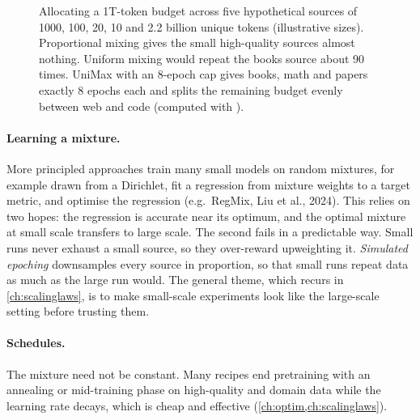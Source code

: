 \begin{figure}[t]
\centering
{}
\caption{Allocating a 1T-token budget across five hypothetical sources of 1000, 100, 20, 10 and 2.2
billion unique tokens (illustrative sizes). Proportional mixing gives the small high-quality
sources almost nothing. Uniform mixing would repeat the books source about 90 times. UniMax with an
8-epoch cap gives books, math and papers exactly 8 epochs each and splits the remaining budget evenly
between web and code (computed with ).}
\label{fig:data:unimax}
\end{figure}

\paragraph{Learning a mixture.} More principled approaches train many small models on random
mixtures, for example drawn from a Dirichlet, fit a regression from mixture weights to a target
metric, and optimise the regression (e.g.\ RegMix, Liu et al., 2024). This relies on two hopes:
the regression is accurate near its optimum, and the optimal mixture at small scale transfers to
large scale. The second fails in a predictable way. Small runs never exhaust a small source, so they
over-reward upweighting it. \emph{Simulated epoching} downsamples every source in proportion, so
that small runs repeat data as much as the large run would. The general theme, which recurs in
\cref{ch:scalinglaws}, is to make small-scale experiments look like the large-scale setting before
trusting them.

\paragraph{Schedules.} The mixture need not be constant. Many recipes end pretraining with an
annealing or mid-training phase on high-quality and domain data while the learning rate decays,
which is cheap and effective (\cref{ch:optim,ch:scalinglaws}).

